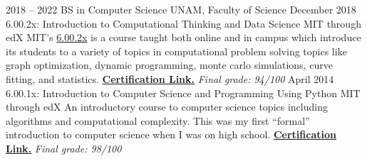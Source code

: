 \documentclass[9pt]{developercv}
\begin{document}
\begin{entrylist}
    \entry
        {2018 -- 2022}
        {BS in Computer Science}
        {UNAM, Faculty of Science}
        {}
    \entry
        {December 2018}
        {6.00.2x: Introduction to Computational Thinking and Data Science}
        {MIT through edX}
        {MIT's {\href{https://www.edx.org/course/introduction-to-computational-thinking-and-data-science-2}{6.00.2x}} is a course taught both online and in campus which introduce its students to a variety of topics in computational problem solving topics like graph optimization, dynamic programming, monte carlo simulations, curve fitting, and statistics. {\href{https://courses.edx.org/certificates/44a472b535354c15b494ac70b98af436}{\textbf{\underline{Certification Link.}}}} \textit{\small{Final grade: 94/100}}} 
    \entry
        {April 2014}
        {6.00.1x: Introduction to Computer Science and Programming Using Python}
        {MIT through edX}
        {An introductory course to computer science topics including algorithms and computational complexity. This was my first ``formal'' introduction to computer science when I was on high school. {\href{https://verify.edx.org/cert/7392793dde3e4537911d04e6ffc0b3f5}{\textbf{\underline{Certification Link.}}}} \textit{\small{Final grade: 98/100}}} 
\end{entrylist}


\end{document}
